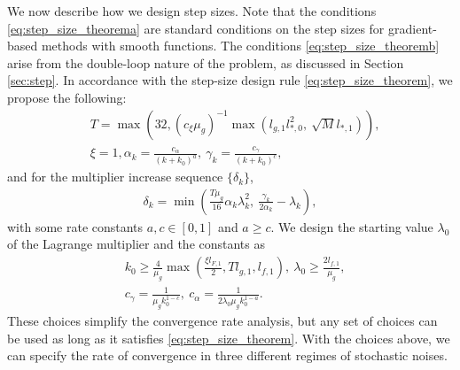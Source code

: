 We now describe how we design step sizes. Note that the conditions \eqref{eq:step_size_theorema} are standard conditions on the step sizes for gradient-based methods with smooth functions. The conditions \eqref{eq:step_size_theoremb} arise from the double-loop nature of the problem, as discussed in Section \ref{sec:step}. In accordance with the step-size design rule \eqref{eq:step_size_theorem}, we propose the following: 
\begin{align}
    &T = \max \left(32, (c_{\xi} \mu_g)^{-1} \max \left(l_{g,1} l_{*,0}^2, \ \sqrt{M} l_{*,1} \right) \right), \nonumber \\
    &\xi = 1, \alpha_k = \frac{c_\alpha}{(k+k_0)^a}, \ \gamma_k = \frac{c_\gamma}{(k+k_0)^c}, \label{eq:step_size_design}
\end{align}
and for the multiplier increase sequence $\{\delta_k\}$,
\begin{align}
    \delta_k = \min\left( \frac{T \mu_g }{16} \alpha_k \lambda_k^2, \ \frac{\gamma_k}{2\alpha_k} - \lambda_k \right), \label{eq:step_size_design_delta}
\end{align}
with some rate constants $a,c \in [0,1]$ and $a \ge c$. We design the starting value $\lambda_0$ of the Lagrange multiplier %
and the constants as
\begin{align}
    &k_0 \ge \frac{4}{\mu_g} \max \left( \frac{ \xi l_{F,1}}{2}, T l_{g,1}, l_{f,1} \right), \ \lambda_0 \ge \frac{2l_{f,1}}{\mu_g} , \nonumber \\
    &c_\gamma = \frac{1}{\mu_g k_0^{1-c}}, \ c_\alpha = \frac{1}{2\lambda_0 \mu_g k_0^{1-a}}. \label{eq:step_size_constant_design}
\end{align}
These choices simplify the convergence rate analysis, but any set of choices can be used as long as it satisfies \eqref{eq:step_size_theorem}. 
With the choices above, we can specify the rate of convergence in three different regimes of stochastic noises.
